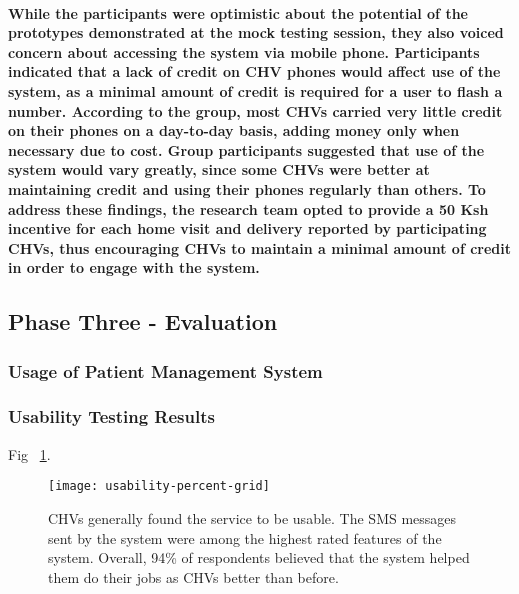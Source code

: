 \paragraph{While the participants were optimistic about the potential of the prototypes demonstrated at the mock testing session, they also voiced concern about accessing the system via mobile phone. Participants indicated that a lack of credit on CHV phones would affect use of the system, as a minimal amount of credit is required for a user to flash a number. According to the group, most CHVs carried very little credit on their phones on a day-to-day basis, adding money only when necessary due to cost. Group participants suggested that use of the system would vary greatly, since some CHVs were better at maintaining credit and using their phones regularly than others. To address these findings, the research team opted to provide a 50 Ksh incentive for each home visit and delivery reported by participating CHVs, thus encouraging CHVs to maintain a minimal amount of credit in order to engage with the system.}


%

\subsection{Phase Three - Evaluation}
\subsubsection{Usage of Patient Management System}

\subsubsection{Usability Testing Results}
Fig ~\ref{fig:barchart}.
\begin{figure}[h]
	\begin{center}
	\texttt{[image: usability-percent-grid]}
	\end{center}
	\caption{CHVs generally found the service to be usable. The SMS messages sent by the system were among the highest rated features of the system. Overall, 94\% of respondents believed that the system helped them do their jobs as CHVs better than before.}
	\label{fig:barchart}
\end{figure}

